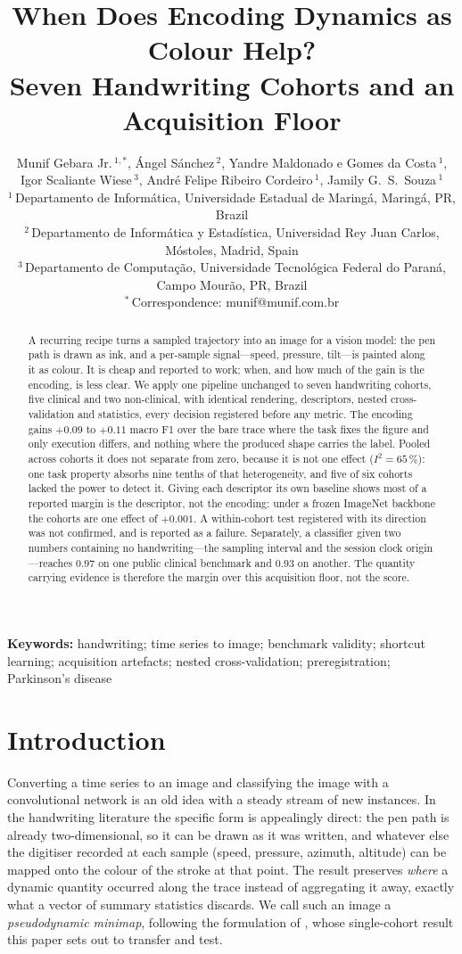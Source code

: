 \documentclass[10pt,a4paper]{article}
\title{\bfseries When Does Encoding Dynamics as Colour Help?\\
       Seven Handwriting Cohorts and an Acquisition Floor}
\author{%
  Munif Gebara Jr.\,$^{1,*}$,\;
  \'Angel S\'anchez\,$^{2}$,\;
  Yandre Maldonado e Gomes da Costa\,$^{1}$,\\
  Igor Scaliante Wiese\,$^{3}$,\;
  Andr\'e Felipe Ribeiro Cordeiro\,$^{1}$,\;
  Jamily G.\ S.\ Souza\,$^{1}$\\[0.7em]
  \small $^{1}$\,Departamento de Inform\'atica, Universidade Estadual de Maring\'a,
    Maring\'a, PR, Brazil\\
  \small $^{2}$\,Departamento de Inform\'atica y Estad\'istica, Universidad Rey Juan Carlos,
    M\'ostoles, Madrid, Spain\\
  \small $^{3}$\,Departamento de Computa\c{c}\~ao, Universidade Tecnol\'ogica Federal do Paran\'a,
    Campo Mour\~ao, PR, Brazil\\[0.3em]
  \small $^{*}$\,Correspondence: munif@munif.com.br
}
\date{}
\begin{document}
\maketitle


\begin{abstract}
\noindent
A recurring recipe turns a sampled trajectory into an image for a vision model: the pen path is
drawn as ink, and a per-sample signal---speed, pressure, tilt---is painted along it as colour. It
is cheap and reported to work; when, and how much of the gain is the encoding, is less clear. We apply one pipeline unchanged to seven handwriting cohorts, five clinical and two
non-clinical, with identical rendering, descriptors, nested cross-validation and statistics,
every decision registered before any metric. The encoding gains
$+0.09$ to $+0.11$ macro F1 over the bare trace where the task fixes the figure and only execution
differs, and nothing where the produced shape carries the label. Pooled across cohorts it does not
separate from zero, because it is not one effect ($I^2 = 65\,\%$): one task property absorbs nine
tenths of that heterogeneity, and five of six cohorts lacked the power to detect it. Giving each descriptor its own baseline shows most of a reported margin is the
descriptor, not the encoding: under a frozen ImageNet backbone the cohorts are one effect of $+0.001$. A within-cohort test registered with its direction was not
confirmed, and is reported as a failure. Separately, a classifier given two numbers containing no
handwriting---the sampling interval and the session clock origin---reaches $0.97$ on one public
clinical benchmark and $0.93$ on another. The quantity carrying evidence is therefore the margin
over this acquisition floor, not the score.
\end{abstract}

\noindent\textbf{Keywords:} handwriting; time series to image; benchmark validity; shortcut
learning; acquisition artefacts; nested cross-validation; preregistration; Parkinson's disease

\vspace{1em}

\section{Introduction}
\label{sec:intro}


Converting a time series to an image and classifying the image with a convolutional network is an
old idea with a steady stream of new instances. In the handwriting literature the specific form is
appealingly direct: the pen path is already two-dimensional, so it can be drawn as it was written,
and whatever else the digitiser recorded at each sample (speed, pressure, azimuth, altitude) can
be mapped onto the colour of the stroke at that point. The result preserves \emph{where} a dynamic
quantity occurred along the trace instead of aggregating it away, exactly what a vector of summary
statistics discards. We call such an image a \emph{pseudodynamic minimap},
following the formulation of \citet{prior2027minimaps}, whose single-cohort result this paper sets
out to transfer and test.
\end{document}
